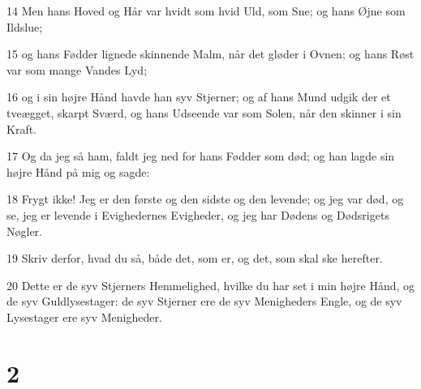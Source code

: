 \par 14 Men hans Hoved og Hår var hvidt som hvid Uld, som Sne; og hans Øjne som Ildslue;
\par 15 og hans Fødder lignede skinnende Malm, når det gløder i Ovnen; og hans Røst var som mange Vandes Lyd;
\par 16 og i sin højre Hånd havde han syv Stjerner; og af hans Mund udgik der et tveægget, skarpt Sværd, og hans Udseende var som Solen, når den skinner i sin Kraft.
\par 17 Og da jeg så ham, faldt jeg ned for hans Fødder som død; og han lagde sin højre Hånd på mig og sagde:
\par 18 Frygt ikke! Jeg er den første og den sidste og den levende; og jeg var død, og se, jeg er levende i Evighedernes Evigheder, og jeg har Dødens og Dødsrigets Nøgler.
\par 19 Skriv derfor, hvad du så, både det, som er, og det, som skal ske herefter.
\par 20 Dette er de syv Stjerners Hemmelighed, hvilke du har set i min højre Hånd, og de syv Guldlysestager: de syv Stjerner ere de syv Menigheders Engle, og de syv Lysestager ere syv Menigheder.

\chapter{2}

